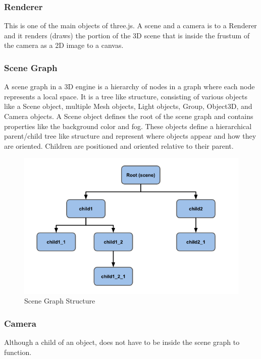 \documentclass{article}
\begin{document}
    \subsubsection{Renderer} This is one of the main objects of three.js. A scene and a camera is to a Renderer and it renders (draws) the portion of the 3D scene that is inside the frustum of the camera as a 2D image to a canvas.

    \subsubsection{Scene Graph}  A scene graph in a 3D engine is a hierarchy of nodes in a graph where each node represents a local space. It is a tree like structure, consisting of various objects like a Scene object, multiple Mesh objects, Light objects, Group, Object3D, and Camera objects.
    A Scene object defines the root of the scene graph and contains properties like the background color and fog. These objects define a hierarchical parent/child tree like structure and represent where objects appear and how they are oriented. Children are positioned and oriented relative to their parent. 
    \begin{figure}[h]
            \centering
            \includegraphics[width=15cm]{images/threeDotJS/sceneGraph.png}
            \caption{Scene Graph Structure}
        \end{figure}
        
    \subsubsection{Camera}
    Although a child of an object, does not have to be inside the scene graph to function.
    
\end{document}
